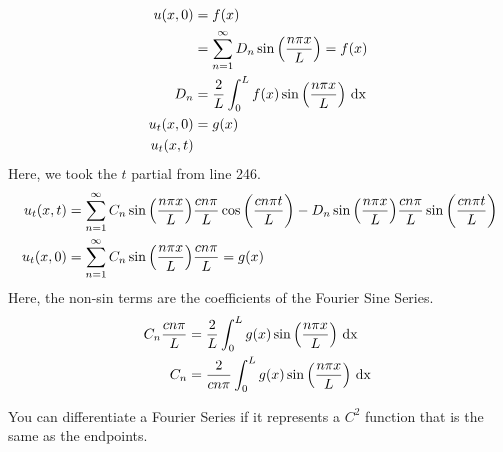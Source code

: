 \documentclass{article}
\begin{document}
\begin{enumerate}
\begin{align}
    u(x, 0) & = f(x)\\
    & = \sum^\infty_{n = 1} D_n \sin \Big( \frac{n \pi x}{L} \Big) = f(x)\\
    D_n & = \frac{2}{L} \int^L_0 f(x) \sin \Big( \frac{n \pi x}{L} \Big) \text{ dx }\\
    u_t(x, 0) & = g(x)\\
    u_t(x, t)
  \end{align}
  Here, we took the $t$ partial from line 246.
  \begin{align}
    u_t(x, t) & = \sum^\infty_{n = 1} C_n \sin \Big( \frac{n \pi x}{L} \Big) \frac{c n \pi}{L} \cos \left(\frac{c n \pi t}{L}\right) - D_n \sin \Big( \frac{n \pi x}{L} \Big) \frac{c n \pi}{L} \sin\left( \frac{c n \pi t}{L} \right)\\
    u_t(x, 0) & = \sum^\infty_{n = 1} C_n \sin \Big( \frac{n \pi x}{L} \Big) \frac{c n \pi}{L} = g(x)
  \end{align}
  Here, the non-sin terms are the coefficients of the Fourier Sine Series.
  \begin{align}
    C_n \frac{c n \pi}{L} & = \frac{2}{L} \int^L_0 g(x) \sin \Big( \frac{n \pi x}{L} \Big) \text{ dx }\\
    C_n & = \frac{2}{c n \pi} \int^L_0 g(x) \sin \Big( \frac{n \pi x}{L} \Big) \text{ dx }
  \end{align}
\end{enumerate}
\thm You can differentiate a Fourier Series if it represents a $C^2$ function that is the same as the endpoints.
\end{document}
